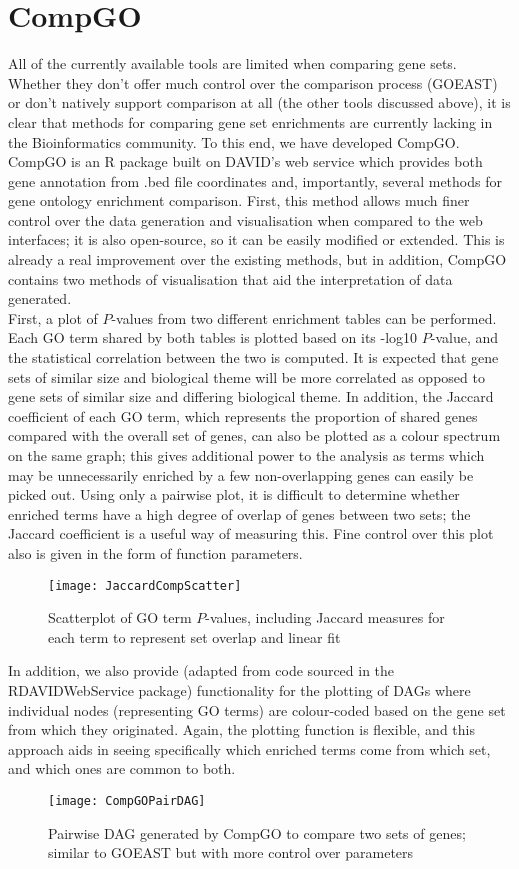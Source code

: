 \documentclass[11pt, oneside]{article}
\begin{document}
\section*{CompGO}
All of the currently available tools are limited when comparing gene sets. Whether they don't offer much control over the comparison process (GOEAST) or don't natively support comparison at all (the other tools discussed above), it is clear that methods for comparing gene set enrichments are currently lacking in the Bioinformatics community. To this end, we have developed CompGO. CompGO is an R package built on DAVID's web service which provides both gene annotation from .bed file coordinates and, importantly, several methods for gene ontology enrichment comparison. First, this method allows much finer control over the data generation and visualisation when compared to the web interfaces; it is also open-source, so it can be easily modified or extended. This is already a real improvement over the existing methods, but in addition, CompGO contains two methods of visualisation that aid the interpretation of data generated.\\
First, a plot of $P$-values from two different enrichment tables can be performed. Each GO term shared by both tables is plotted based on its -log10 $P$-value, and the statistical correlation between the two is computed. It is expected that gene sets of similar size and biological theme will be more correlated as opposed to gene sets of similar size and differing biological theme. In addition, the Jaccard coefficient of each GO term, which represents the proportion of shared genes compared with the overall set of genes, can also be plotted as a colour spectrum on the same graph; this gives additional power to the analysis as terms which may be unnecessarily enriched by a few non-overlapping genes can easily be picked out. Using only a pairwise plot, it is difficult to determine whether enriched terms have a high degree of overlap of genes between two sets; the Jaccard coefficient is a useful way of measuring this. Fine control over this plot also is given in the form of function parameters.\\
\begin{figure}[h!]
	\texttt{[image: JaccardCompScatter]}
	\caption{Scatterplot of GO term $P$-values, including Jaccard measures for each term to represent set overlap and linear fit}
\end{figure}
In addition, we also provide (adapted from code sourced in the RDAVIDWebService package) functionality for the plotting of DAGs where individual nodes (representing GO terms) are colour-coded based on the gene set from which they originated. Again, the plotting function is flexible, and this approach aids in seeing specifically which enriched terms come from which set, and which ones are common to both.
\begin{figure}[h!]
	\texttt{[image: CompGOPairDAG]}
	\caption{Pairwise DAG generated by CompGO to compare two sets of genes; similar to GOEAST but with more control over parameters}
\end{figure}
\end{document}
